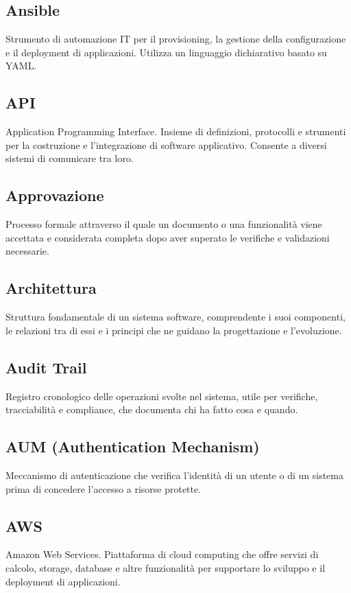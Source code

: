 \documentclass[a4paper,11pt]{article}
\begin{document}
\subsection{Ansible}
Strumento di automazione IT per il provisioning, la gestione della configurazione e il deployment di applicazioni. Utilizza un linguaggio dichiarativo basato su YAML.

\subsection{API}
Application Programming Interface. Insieme di definizioni, protocolli e strumenti per la costruzione e l'integrazione di software applicativo. Consente a diversi sistemi di comunicare tra loro.

\subsection{Approvazione}
Processo formale attraverso il quale un documento o una funzionalità viene accettata e considerata completa dopo aver superato le verifiche e validazioni necessarie.

\subsection{Architettura}
Struttura fondamentale di un sistema software, comprendente i suoi componenti, le relazioni tra di essi e i principi che ne guidano la progettazione e l'evoluzione.

\subsection{Audit Trail}
Registro cronologico delle operazioni svolte nel sistema, utile per verifiche, tracciabilità e compliance, che documenta chi ha fatto cosa e quando.

\subsection{AUM (Authentication Mechanism)}
Meccanismo di autenticazione che verifica l'identità di un utente o di un sistema prima di concedere l'accesso a risorse protette.

\subsection{AWS}
Amazon Web Services. Piattaforma di cloud computing che offre servizi di calcolo, storage, database e altre funzionalità per supportare lo sviluppo e il deployment di applicazioni.
\end{document}
